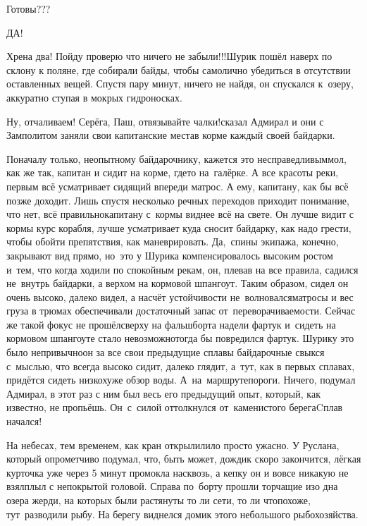 \diagdash Готовы???

\diagdash ДА!

\diagdash Хрена два! Пойду проверю что ничего не забыли!!!\mdash Шурик пошёл наверх по склону к поляне, где собирали байды, чтобы самолично убедиться в отсутствии оставленных вещей. Спустя пару минут, ничего не найдя, он спускался к~озеру, аккуратно ступая в мокрых гидроносках.

\diagdash Ну, отчаливаем! Серёга, Паш, отвязывайте чалки!\mdash сказал Адмирал и они с Замполитом заняли свои капитанские места\mdash в корме каждый своей байдарки. 

Поначалу только, неопытному байдарочнику, кажется это несправедливым\mdash мол, как же так, капитан и сидит на корме, где\sdash то на~галёрке. А все красоты реки, первым всё усматривает сидящий впереди матрос. А ему, капитану, как бы всё позже доходит. Лишь спустя несколько речных переходов приходит понимание, что нет, всё правильно\mdash капитану с~кормы виднее всё на свете. Он лучше видит с кормы курс корабля, лучше усматривает куда сносит байдарку, как надо грести, чтобы обойти препятствия, как маневрировать. Да,~спины экипажа, конечно, закрывают вид прямо, но~это у Шурика компенсировалось высоким ростом и~тем, что когда ходили по спокойным рекам, он, плевав на все правила, садился не~внутрь байдарки, а верхом на кормовой шпангоут. Таким образом, сидел он очень высоко, далеко видел, а насчёт устойчивости не~волновался\mdash матросы и вес груза в трюмах обеспечивали достаточный запас от~переворачиваемости. Сейчас же такой фокус не прошёл\mdash сверху на фальшборта надели фартук и~сидеть на кормовом шпангоуте стало невозможно\mdash тогда бы повредился фартук. Шурику это было непривычно\mdash он за все свои предыдущие сплавы байдарочные свыкся с~мыслью, что всегда высоко сидит, далеко глядит, а~тут, как в первых сплавах, придётся сидеть низко\mdash хуже обзор воды. А~на~маршруте\mdash пороги. Ничего, подумал Адмирал, в этот раз с ним был весь его предыдущий опыт, который, как известно, не пропьёшь. Он~с~силой оттолкнулся от~каменистого берега\mdash Cплав начался!

На небесах, тем временем, как кран открыли\mdash лило просто ужасно. У Руслана, который опрометчиво подумал, что, быть может, дождик скоро закончится, лёгкая курточка уже через 5 минут промокла насквозь, а кепку он и вовсе никакую не взял\mdash плыл с непокрытой головой. Справа по~борту прошли торчащие изо дна озера жерди, на которых были растянуты то ли сети, то ли что\mdash похоже, тут~разводили рыбу. На берегу виднелся домик этого небольшого рыбохозяйства.

